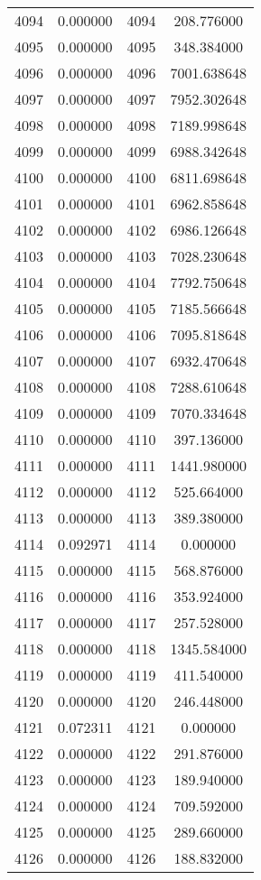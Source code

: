 \documentclass[12pt]{article}
\begin{document}
\begin{longtable}{@{}cccc@{}}
4094 & 0.000000 & 4094 & 208.776000 \\
4095 & 0.000000 & 4095 & 348.384000 \\
4096 & 0.000000 & 4096 & 7001.638648 \\
4097 & 0.000000 & 4097 & 7952.302648 \\
4098 & 0.000000 & 4098 & 7189.998648 \\
4099 & 0.000000 & 4099 & 6988.342648 \\
4100 & 0.000000 & 4100 & 6811.698648 \\
4101 & 0.000000 & 4101 & 6962.858648 \\
4102 & 0.000000 & 4102 & 6986.126648 \\
4103 & 0.000000 & 4103 & 7028.230648 \\
4104 & 0.000000 & 4104 & 7792.750648 \\
4105 & 0.000000 & 4105 & 7185.566648 \\
4106 & 0.000000 & 4106 & 7095.818648 \\
4107 & 0.000000 & 4107 & 6932.470648 \\
4108 & 0.000000 & 4108 & 7288.610648 \\
4109 & 0.000000 & 4109 & 7070.334648 \\
4110 & 0.000000 & 4110 & 397.136000 \\
4111 & 0.000000 & 4111 & 1441.980000 \\
4112 & 0.000000 & 4112 & 525.664000 \\
4113 & 0.000000 & 4113 & 389.380000 \\
4114 & 0.092971 & 4114 & 0.000000 \\
4115 & 0.000000 & 4115 & 568.876000 \\
4116 & 0.000000 & 4116 & 353.924000 \\
4117 & 0.000000 & 4117 & 257.528000 \\
4118 & 0.000000 & 4118 & 1345.584000 \\
4119 & 0.000000 & 4119 & 411.540000 \\
4120 & 0.000000 & 4120 & 246.448000 \\
4121 & 0.072311 & 4121 & 0.000000 \\
4122 & 0.000000 & 4122 & 291.876000 \\
4123 & 0.000000 & 4123 & 189.940000 \\
4124 & 0.000000 & 4124 & 709.592000 \\
4125 & 0.000000 & 4125 & 289.660000 \\
4126 & 0.000000 & 4126 & 188.832000 \\

\end{longtable}
\end{document}
